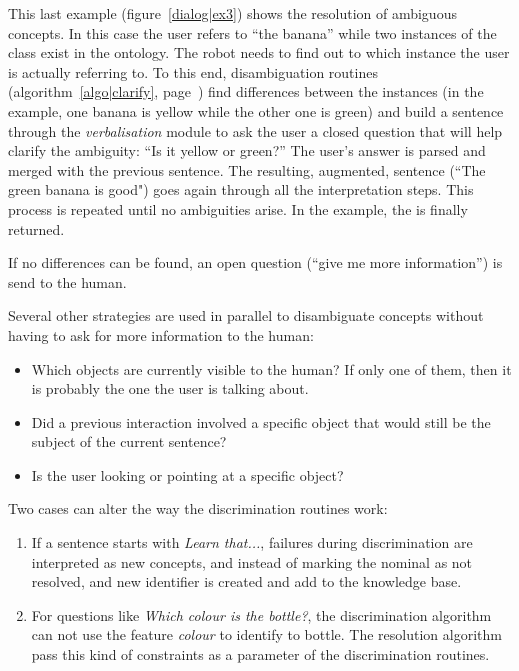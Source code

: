 This last example (figure~\ref{dialog|ex3}) shows the resolution of ambiguous
concepts. In this case the user refers to ``the banana'' while two instances of
the  class exist in the ontology. The robot needs to find out
to which instance the user is actually referring to. To this end,
disambiguation routines (algorithm~\ref{algo|clarify}, page~\pageref{algo|clarify})
find differences between the
instances (in the example, one banana is yellow while the other one is green)
and build a sentence through the \emph{verbalisation} module to ask the user a
closed question that will help clarify the ambiguity: ``Is it yellow or
green?'' The user's answer is parsed and merged with the previous sentence. The
resulting, augmented, sentence (``The green banana is good") goes again through
all the interpretation steps. This process is repeated until no ambiguities
arise.  In the example, the  is finally returned.

If no differences can be found, an open question (``give me more information'')
is send to the human.

Several other strategies are used in parallel to disambiguate concepts without
having to ask for more information to the human:

\begin{itemize}
	\item Which objects are currently visible to the human? If only one of
	them, then it is probably the one the user is talking about. 
	\item Did a previous interaction involved a specific object that would
	still be the subject of the current sentence?
	\item Is the user looking or pointing at a specific object?
\end{itemize}

Two cases can alter the way the discrimination routines work:
\begin{enumerate}
    \item If a sentence starts with {\it Learn that...}, failures during 
    discrimination are interpreted as new concepts, and instead of marking the 
    nominal as not resolved, and new identifier is created and add to the knowledge base.
    \item For questions like {\it Which colour is the bottle?}, the discrimination 
    algorithm can not use the feature {\it colour} to identify to bottle. The 
    resolution algorithm pass this kind of constraints as a parameter of the 
    discrimination routines.
\end{enumerate}

